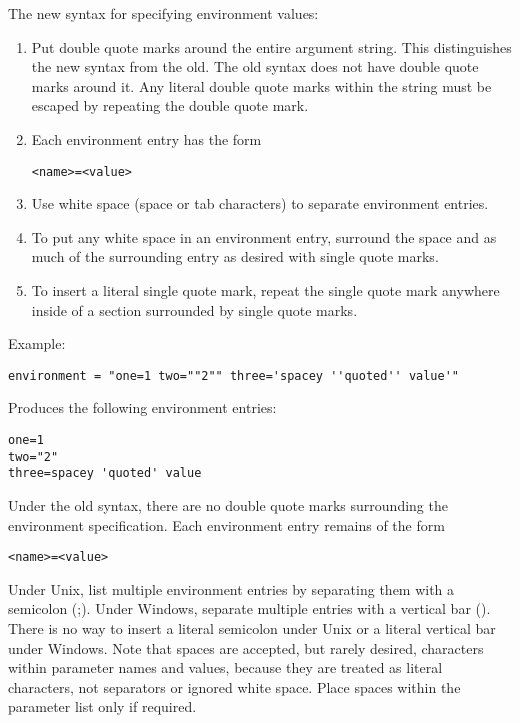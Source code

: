 \begin{description}
The new syntax for specifying environment values:

\begin{enumerate}

\item Put double quote marks around the entire argument string.  This
distinguishes the new syntax from the old.
The old syntax does not have double quote marks around it.
Any literal double quote marks within the string
must be escaped by repeating the double quote mark.

\item Each environment entry has the form

\begin{verbatim}
<name>=<value>
\end{verbatim}

\item Use white space (space or tab characters) to separate environment entries.

\item To put any white space in an environment entry, surround
the space and as much of the surrounding entry as desired with
single quote marks.

\item To insert a literal single quote mark, repeat the single quote mark
anywhere inside of a section surrounded by single quote marks.

\end{enumerate}

Example:

\begin{verbatim}
environment = "one=1 two=""2"" three='spacey ''quoted'' value'"
\end{verbatim}

Produces the following environment entries:

\begin{verbatim}
one=1
two="2"
three=spacey 'quoted' value
\end{verbatim}

Under the old syntax, there are no double quote marks surrounding the
environment specification.  Each environment entry remains of the form
\begin{verbatim}
<name>=<value>
\end{verbatim}
Under Unix, list multiple environment entries by separating them with
a semicolon (;).  Under Windows, separate multiple entries with a
vertical bar (\Bar).  There is no way to insert a literal semicolon
under Unix or a literal vertical bar under Windows.  Note that spaces
are accepted, but rarely desired, characters within parameter names
and values, because they are treated as literal characters, not
separators or ignored white space.  Place spaces within the parameter
list only if required.


\end{description}
